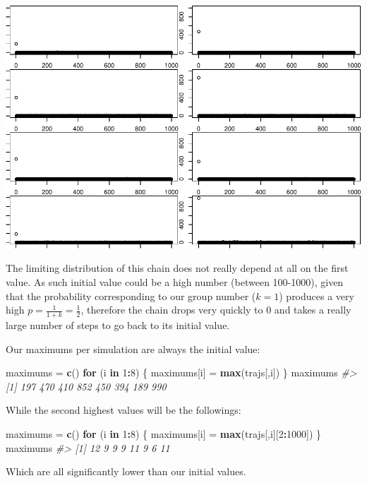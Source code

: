 \documentclass[]{article}
\newenvironment{Shaded}{\begin{snugshade}}{\end{snugshade}}
\newcommand{\CommentTok}[1]{\textcolor[rgb]{0.56,0.35,0.01}{\textit{#1}}}
\newcommand{\ControlFlowTok}[1]{\textcolor[rgb]{0.13,0.29,0.53}{\textbf{#1}}}
\newcommand{\DecValTok}[1]{\textcolor[rgb]{0.00,0.00,0.81}{#1}}
\newcommand{\KeywordTok}[1]{\textcolor[rgb]{0.13,0.29,0.53}{\textbf{#1}}}
\newcommand{\NormalTok}[1]{#1}
\newcommand{\OperatorTok}[1]{\textcolor[rgb]{0.81,0.36,0.00}{\textbf{#1}}}
\newcommand{\StringTok}[1]{\textcolor[rgb]{0.31,0.60,0.02}{#1}}
\begin{document}
\includegraphics{./figures/unnamed-chunk-15-1.pdf}

The limiting distribution of this chain does not really depend at all on
the first value. As such initial value could be a high number (between
100-1000), given that the probability corresponding to our group number
(\(k=1\)) produces a very high \(p=\frac{1}{1+k} = \frac{1}{2}\),
therefore the chain drops very quickly to 0 and takes a really large
number of steps to go back to its initial value.

Our maximums per simulation are always the initial value:

\begin{Shaded}
\begin{Highlighting}[]
\NormalTok{maximums =}\StringTok{ }\KeywordTok{c}\NormalTok{()}
\ControlFlowTok{for}\NormalTok{ (i }\ControlFlowTok{in} \DecValTok{1}\OperatorTok{:}\DecValTok{8}\NormalTok{) \{}
\NormalTok{    maximums[i] =}\StringTok{ }\KeywordTok{max}\NormalTok{(trajs[,i])}
\NormalTok{\}}
\NormalTok{maximums}
\CommentTok{#> [1] 197 470 410 852 450 394 189 990}
\end{Highlighting}
\end{Shaded}

While the second highest values will be the followings:

\begin{Shaded}
\begin{Highlighting}[]
\NormalTok{maximums =}\StringTok{ }\KeywordTok{c}\NormalTok{()}
\ControlFlowTok{for}\NormalTok{ (i }\ControlFlowTok{in} \DecValTok{1}\OperatorTok{:}\DecValTok{8}\NormalTok{) \{}
\NormalTok{    maximums[i] =}\StringTok{ }\KeywordTok{max}\NormalTok{(trajs[,i][}\DecValTok{2}\OperatorTok{:}\DecValTok{1000}\NormalTok{])}
\NormalTok{\}}
\NormalTok{maximums}
\CommentTok{#> [1] 12  9  9  9 11  9  6 11}
\end{Highlighting}
\end{Shaded}

Which are all significantly lower than our initial values.
\end{document}
